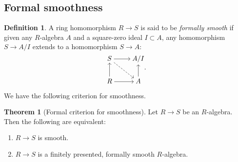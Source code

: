 \documentclass[letterpaper,10pt,twoside]{amsart}
\theoremstyle{proposition}
\theoremstyle{definition}
\newtheorem{definition}[proposition]{Definition}
\theoremstyle{theorem}
\newtheorem{theorem}[proposition]{Theorem}
\theoremstyle{definition}
\theoremstyle{definition}
\theoremstyle{definition}
\theoremstyle{lemma}
\theoremstyle{definition}
\theoremstyle{definition}
\theoremstyle{corollary}
\theoremstyle{definition}
\begin{document}
	\subsection{Formal smoothness}
	\begin{definition}
		A ring homomorphism $R\to S$ is said to be \textit{formally smooth} if given any $R$-algebra $A$ and a square-zero ideal $I \subset A$, any homomorphism $S\to A/I$ extends to a homomorphism $S\to A$:
		\[\begin{tikzcd}[cramped]
			S & {A/I} \\
			R & A
			\arrow[from=1-1, to=1-2]
			\arrow[dashed, from=1-1, to=2-2]
			\arrow[from=2-1, to=1-1]
			\arrow[from=2-1, to=2-2]
			\arrow[from=2-2, to=1-2]
		\end{tikzcd}.\]
	\end{definition}
	We have the following criterion for smoothness.
	\begin{theorem}[Formal criterion for smoothness]
		Let $R\to S$ be an $R$-algebra. Then the following are equivalent:
		\begin{enumerate}
			\item {$R\to S$ is smooth.}
			\item {$R\to S$ is a finitely presented, formally smooth $R$-algebra.}
		\end{enumerate}
	\end{theorem}
	
\end{document}
